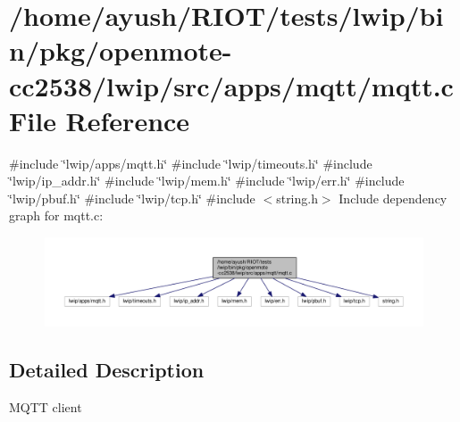 \hypertarget{openmote-cc2538_2lwip_2src_2apps_2mqtt_2mqtt_8c}{}\section{/home/ayush/\+R\+I\+O\+T/tests/lwip/bin/pkg/openmote-\/cc2538/lwip/src/apps/mqtt/mqtt.c File Reference}
\label{openmote-cc2538_2lwip_2src_2apps_2mqtt_2mqtt_8c}
{\ttfamily \#include \char`\"{}lwip/apps/mqtt.\+h\char`\"{}}\newline
{\ttfamily \#include \char`\"{}lwip/timeouts.\+h\char`\"{}}\newline
{\ttfamily \#include \char`\"{}lwip/ip\+\_\+addr.\+h\char`\"{}}\newline
{\ttfamily \#include \char`\"{}lwip/mem.\+h\char`\"{}}\newline
{\ttfamily \#include \char`\"{}lwip/err.\+h\char`\"{}}\newline
{\ttfamily \#include \char`\"{}lwip/pbuf.\+h\char`\"{}}\newline
{\ttfamily \#include \char`\"{}lwip/tcp.\+h\char`\"{}}\newline
{\ttfamily \#include $<$string.\+h$>$}\newline
Include dependency graph for mqtt.\+c\+:
\nopagebreak
\begin{figure}[H]
\begin{center}
\leavevmode
\includegraphics[width=350pt]{openmote-cc2538_2lwip_2src_2apps_2mqtt_2mqtt_8c__incl}
\end{center}
\end{figure}


\subsection{Detailed Description}
M\+Q\+TT client 